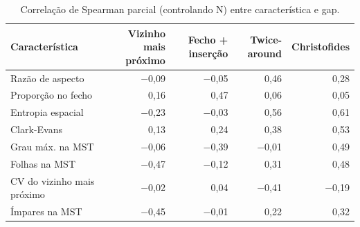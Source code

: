 \begin{table}[htb]
\centering
\caption{Correlação de Spearman parcial (controlando N) entre característica e gap.}
\label{tab:sensitivity-spearman}
\small
\setlength{\tabcolsep}{4pt}
\begin{tabular}{lrrrr}
\toprule
Característica & Vizinho mais próximo & Fecho + inserção & Twice-around & Christofides \\
\midrule
Razão de aspecto & $-$0{,}09 & $-$0{,}05 & 0{,}46 & 0{,}28 \\
Proporção no fecho & 0{,}16 & 0{,}47 & 0{,}06 & 0{,}05 \\
Entropia espacial & $-$0{,}23 & $-$0{,}03 & 0{,}56 & 0{,}61 \\
Clark-Evans & 0{,}13 & 0{,}24 & 0{,}38 & 0{,}53 \\
Grau máx. na MST & $-$0{,}06 & $-$0{,}39 & $-$0{,}01 & 0{,}49 \\
Folhas na MST & $-$0{,}47 & $-$0{,}12 & 0{,}31 & 0{,}48 \\
CV do vizinho mais próximo & $-$0{,}02 & 0{,}04 & $-$0{,}41 & $-$0{,}19 \\
Ímpares na MST & $-$0{,}45 & $-$0{,}01 & 0{,}22 & 0{,}32 \\
\bottomrule
\end{tabular}
\end{table}
